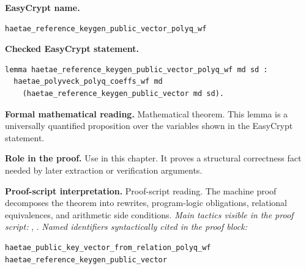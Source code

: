 \begin{formaltheorem}
\noindent\textbf{EasyCrypt name.}
\begin{lstlisting}[language=EasyCrypt,basicstyle=\ttfamily\scriptsize]
haetae_reference_keygen_public_vector_polyq_wf
\end{lstlisting}
\noindent\textbf{Checked EasyCrypt statement.}
\begin{lstlisting}[language=EasyCrypt,basicstyle=\ttfamily\scriptsize]
lemma haetae_reference_keygen_public_vector_polyq_wf md sd :
  haetae_polyveck_polyq_coeffs_wf md
    (haetae_reference_keygen_public_vector md sd).
\end{lstlisting}
\noindent\textbf{Formal mathematical reading.}
Mathematical theorem. This lemma is a universally quantified proposition over the variables shown in the EasyCrypt statement.

\noindent\textbf{Role in the proof.}
Use in this chapter. It proves a structural correctness fact needed by later extraction or verification arguments.

\noindent\textbf{Proof-script interpretation.}
Proof-script reading. The machine proof decomposes the theorem into rewrites, program-logic obligations, relational equivalences, and arithmetic side conditions.
\emph{Main tactics visible in the proof script:} , .
\emph{Named identifiers syntactically cited in the proof block:}
\begin{lstlisting}[language=EasyCrypt,basicstyle=\ttfamily\scriptsize]
haetae_public_key_vector_from_relation_polyq_wf
haetae_reference_keygen_public_vector
\end{lstlisting}

\end{formaltheorem}


